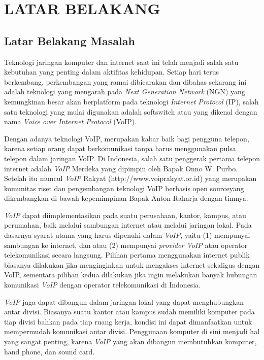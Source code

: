 \documentclass{jtetiproposalskripsi}
\begin{document}
\chapter{LATAR BELAKANG}

\section{Latar Belakang Masalah}
Teknologi jaringan komputer dan internet saat ini telah  menjadi salah satu kebutuhan yang penting dalam aktifitas kehidupan. Setiap hari terus  berkembang, perkembangan yang ramai dibicarakan dan dibahas sekarang ini adalah teknologi yang mengarah pada \emph{Next  Generation Network} (NGN) yang kemungkinan besar akan berplatform pada teknologi \emph{Internet Protocol} (IP), salah satu teknologi yang mulai digunakan adalah softswitch  atau yang dikenal dengan nama \emph{Voice over Internet Protocol} (VoIP). 

Dengan adanya teknologi VoIP, merupakan kabar baik bagi pengguna telepon, karena setiap orang  dapat berkomunikasi tanpa harus menggunakan pulsa telepon dalam jaringan VoIP. Di Indonesia,  salah satu  penggerak  pertama  telepon  internet  adalah  \emph{VoIP}  Merdeka  yang dipimpin  oleh  Bapak Onno W. Purbo. Setelah itu muncul \emph{VoIP} Rakyat (http://www.voiprakyat.or.id) yang merupakan komunitas riset  dan pengembangan teknologi VoIP berbasis open sourceyang dikembangkan di bawah kepemimpinan Bapak Anton Raharja dengan timnya.

\emph{VoIP} dapat  diimplementasikan pada suatu perusahaan, kantor, kampus, atau perumahan, baik melalui sambungan internet atau melalui jaringan lokal. Pada dasarnya syarat utama  yang  harus dipenuhi dalam \emph{VoIP}, yaitu (1) mempunyai  sambungan  ke internet, dan atau  (2) mempunyai \emph{provider VoIP} atau operator telekomunikasi secara langsung. Pilihan pertama menggunakan  internet  publik  biasanya  dilakukan  jika menginginkan  untuk  mengakses  internet sekaligus dengan VoIP, sementara pilihan kedua dilakukan jika ingin melakukan banyak hubungan komunikasi \emph{VoIP} dengan operator telekomunikasi di Indonesia.

\emph{VoIP} juga dapat dibangun dalam jaringan lokal yang dapat menghubungkan antar divisi.  Biasanya suatu kantor atau kampus sudah memiliki komputer pada tiap divisi bahkan pada tiap ruang kerja, kondisi ini dapat dimanfaatkan untuk mempermudah komunikasi antar divisi. Penggunaan komputer di sini menjadi hal yang sangat penting, karena \emph{VoIP} yang akan dibangun  membutuhkan komputer, hand phone, dan sound card.
\end{document}
